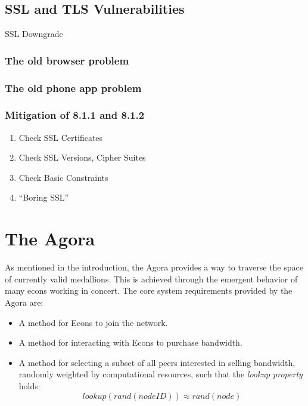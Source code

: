 \documentclass{article}
\begin{document}
\subsection{SSL and TLS Vulnerabilities}

SSL Downgrade

\subsubsection{The old browser problem}

\subsubsection{The old phone app problem}

\subsubsection{Mitigation of 8.1.1 and 8.1.2}

\begin{enumerate}
    \item Check SSL Certificates
    \item Check SSL Versions, Cipher Suites
    \item Check Basic Constraints
    \item “Boring SSL”
\end{enumerate}


\section{The Agora}
\label{sec:agora}

As mentioned in the introduction, the Agora provides a way to traverse the space of currently valid medallions. This is achieved through the emergent behavior of many econs working in concert. The core system requirements provided by the Agora are:

\begin{itemize}
    \item A method for Econs to join the network.
    \item A method for interacting with Econs to purchase bandwidth.
    \item A method for selecting a subset of all peers interested in selling bandwidth, randomly weighted by computational resources, such that the \emph{lookup property} holds: $$lookup(rand(nodeID)) \approx rand(node)$$
\end{itemize}
\end{document}
